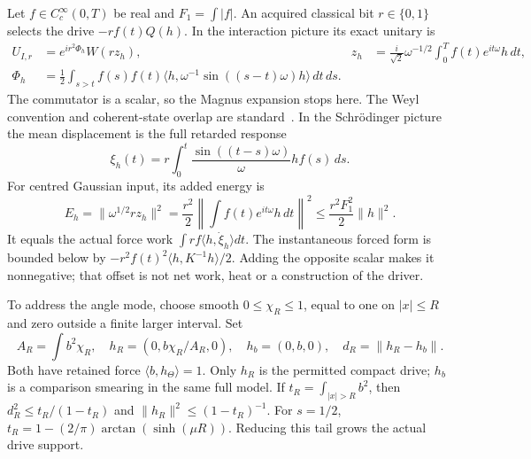 Let $f\in C_c^\infty(0,T)$ be real and $F_1=\int|f|$.
An acquired classical bit $r\in\{0,1\}$ selects the drive
$-rf(t)Q(h)$. In the interaction picture its exact unitary is
\begin{align}
 U_{I,r}&=e^{ir^2\Phi_h}W(rz_h),&
 z_h&=\frac{i}{\sqrt2}\omega^{-1/2}
                 \int_0^T f(t)e^{it\omega}h\,dt,\nonumber\\
 \Phi_h&=\frac12\int_{s>t}f(s)f(t)
   \langle h,\omega^{-1}\sin((s-t)\omega)h\rangle\,dt\,ds.
 \label{eq:material-drive}
\end{align}
The commutator is a scalar, so the Magnus expansion stops here.
The Weyl convention and coherent-state overlap are standard~\cite{Weedbrook}.
In the Schr\"odinger picture the mean displacement is the full retarded
response
\[
 \xi_h(t)=r\int_0^t\frac{\sin((t-s)\omega)}{\omega}h f(s)\,ds.
\]
For centred Gaussian input, its added energy is
\[
 E_h=\|\omega^{1/2}rz_h\|^2
   =\frac{r^2}{2}\left\|\int f(t)e^{it\omega}h\,dt\right\|^2
   \le\frac{r^2F_1^2}{2}\|h\|^2.
\]
It equals the actual force work $\int rf\langle h,\dot\xi_h\rangle dt$.
The instantaneous forced form is bounded below by
$-r^2f(t)^2\langle h,K^{-1}h\rangle/2$.
Adding the opposite scalar makes it nonnegative; that offset is not
net work, heat or a construction of the driver.

To address the angle mode, choose smooth $0\le\chi_R\le1$, equal to one
on $|x|\le R$ and zero outside a finite larger interval. Set
\[
 A_R=\int b^2\chi_R,\quad h_R=(0,b\chi_R/A_R,0),\quad
 h_b=(0,b,0),\quad d_R=\|h_R-h_b\|.
\]
Both have retained force $\langle b,h_\Theta\rangle=1$.
Only $h_R$ is the permitted compact drive; $h_b$ is a comparison
smearing in the same full model. If $t_R=\int_{|x|>R}b^2$, then
$d_R^2\le t_R/(1-t_R)$ and $\|h_R\|^2\le(1-t_R)^{-1}$.
For $s=1/2$, $t_R=1-(2/\pi)\arctan(\sinh(\mu R))$.
Reducing this tail grows the actual drive support.

